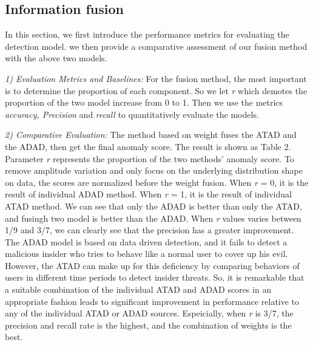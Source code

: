 \documentclass[conference]{IEEEtran}
\begin{document}
\subsection{Information fusion}
In this section,  we first introduce the performance metrics for evaluating the detection model.
we then provide a comparative assessment of our fusion method with the above two models.

\emph{1) Evaluation Metrics and Baselines:}
For the fusion method, the most important is to determine the proportion of each component. So we let \emph{r} which demotes the proportion of the two model increase from 0 to 1. Then we use the metrics \emph{accuracy, Precision} and \emph{recall} to quantitatively evaluate the models.

\emph{2) Comparative Evaluation:} 
The method based on weight fuses the ATAD and the ADAD, then get the final anomaly score. The result is shown as Table 2.
Parameter \emph{r} represents the proportion of the two methods' anomaly score. To remove amplitude variation and only focus on the underlying distribution shape on data, the scores are normalized before the weight fusion. When \emph{r} = 0, it is the result of individual ADAD method. When \emph{r} = 1, it is the result of individual ATAD method. We can see that  
only the ADAD is better than only the ATAD, and fusingh  two model is better than the ADAD. When \emph{r} values varies between 1/9 and 3/7, we can clearly see that the precision has a greater improvement. The ADAD model is based on data driven detection, and it fails to detect a malicious insider who tries to behave like a normal user to cover up his evil. However, the ATAD can make up for this deficiency by comparing behaviors of users in different time periods to detect insider threats. So, it is remarkable that a suitable combination of the individual ATAD and ADAD scores in an appropriate fashion leads to significant improvement in performance relative to any of the individual ATAD or ADAD sources. Espeicially, when \emph{r} is 3/7, the precision and recall rate is the highest, and the combination of weights is the best.
\end{document}
